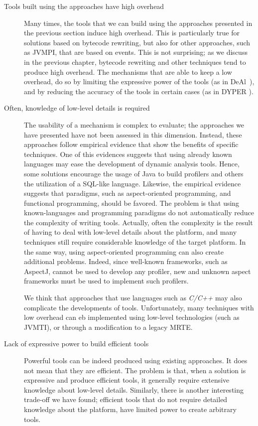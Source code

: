 \begin{description}
\item[Tools built using the approaches have high overhead]
Many times, the tools that we can build using the approaches presented in the previous section induce high overhead.
This is particularly true for solutions based on bytecode rewriting, but also for other approaches, such as JVMPI, that are based on events.
This is not surprising; as we discuss in the previous chapter, bytecode rewriting and other techniques tend to produce high overhead.
The mechanisms that are able to keep a low overhead, do so by limiting the expressive power of the tools (as in DeAl~\cite{Reichenbach:2010:GCE:1869459.1869482}), and by reducing the accuracy of the tools in certain cases (as in DYPER \cite{Reiss:2008:CDP:1383559.1383566}). 


\item[Often, knowledge of low-level details is required] 
The usability of a mechanism is complex to evaluate; the approaches we have presented have not been assessed in this dimension.
Instead, these approaches follow empirical evidence that show the benefits of specific techniques.
One of this evidences suggests that using already known languages may ease the development of dynamic analysis tools.
Hence, some solutions encourage the usage of Java to build profilers and others the utilization of a SQL-like language.
Likewise, the empirical evidence suggests that paradigms, such as aspect-oriented programming, and functional programming, should be favored.
The problem is that using known-languages and programming paradigms do not automatically reduce the complexity of writing tools.
Actually, often the complexity is the result of having to deal with low-level details about the platform,
and many techniques still require considerable knowledge of the target platform.
In the same way, using aspect-oriented programming can also create additional problems.
Indeed, since well-known frameworks, such as AspectJ, cannot be used to develop any profiler, new and unknown aspect frameworks must be used to implement such profilers.

We think that approaches that use languages such as \textit{C/C++} may also complicate the developments of tools.
Unfortunately, many techniques with low overhead can eb implemented using low-level technologies (such as JVMTI), or through a modification to a legacy MRTE.

\item[Lack of expressive power to build efficient tools] 
Powerful tools can be indeed produced using existing approaches.
It does not mean that they are efficient.
The problem is that, when a solution is expressive and produce efficient tools, it generally require extensive knowledge about low-level details.
Similarly, there is another interesting trade-off we have found; efficient tools that do not require detailed knowledge about the platform, have limited power to create arbitrary tools. 
\end{description}

